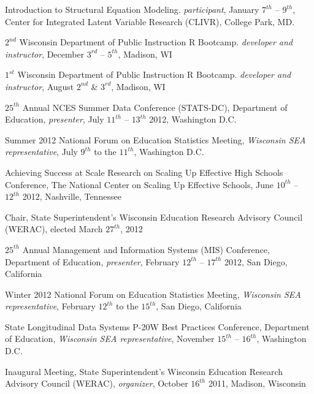 \documentclass[margin,line]{res}
\begin{document}
\begin{resume}
Introduction to Structural Equation Modeling. \emph{participant}, January $7^{th}$ -- $9^{th}$, Center for Integrated Latent Variable Research (CLIVR), College Park, MD.

$2^{nd}$ Wisconsin Department of Public Instruction R Bootcamp. \emph{developer and instructor}, December $3^{rd}$ -- $5^{th}$, Madison, WI

$1^{st}$ Wisconsin Department of Public Instruction R Bootcamp. \emph{developer and instructor}, August $2^{nd}$ \& $3^{rd}$, Madison, WI

$25^{th}$ Annual NCES Summer Data Conference (STATS-DC), Department of Education, \emph{presenter}, July $11^{th}$ -- $13^{th}$ 2012, Washington D.C.

Summer 2012 National Forum on Education Statistics Meeting, \emph{Wisconsin SEA representative}, July $9^{th}$ to the $11^{th}$, Washington D.C.

Achieving Success at Scale Research on Scaling Up Effective High Schools Conference, The National Center on Scaling Up Effective Schools, June $10^{th}$ -- $12^{th}$ 2012, Nashville, Tennessee


Chair, State Superintendent's Wisconsin Education Research Advisory Council (WERAC), elected March $27^{th}$, 2012

$25^{th}$ Annual Management and Information Systems (MIS) Conference, Department of Education, \emph{presenter}, February $12^{th}$ -- $17^{th}$ 2012, San Diego, California

Winter 2012 National Forum on Education Statistics Meeting, \emph{Wisconsin SEA representative}, February $12^{th}$ to the $15^{th}$, San Diego, California

State Longitudinal Data Systems P-20W Best Practices Conference, Department of Education, \emph{Wisconsin SEA representative}, November $15^{th}$ -- $16^{th}$, Washington D.C.


Inaugural Meeting, State Superintendent's Wisconsin Education Research Advisory Council (WERAC), \emph{organizer}, October $16^{th}$ 2011, Madison, Wisconsin



\end{resume}
\end{document}
